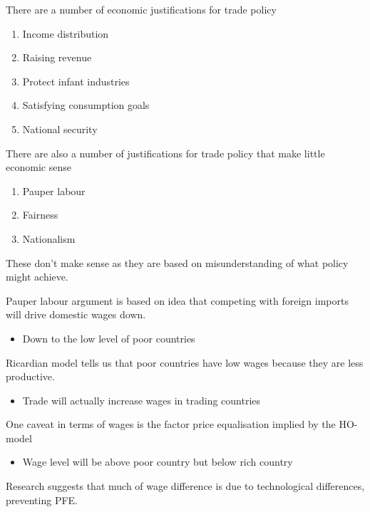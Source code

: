 \documentclass{beamer}
\begin{document}
\begin{frame}
 There are a number of economic justifications for trade policy
 \begin{enumerate}
   \item Income distribution
   \item Raising revenue
   \item Protect infant industries
   \item Satisfying consumption goals
   \item National security
 \end{enumerate}
\end{frame}

\begin{frame}
There are also a number of justifications for trade policy that make little economic sense
\begin{enumerate}
  \item Pauper labour
  \item Fairness
  \item Nationalism
\end{enumerate}
\medskip
These don't make sense as they are based on misunderstanding of what policy might achieve. 
 \end{frame}

\begin{frame}
Pauper labour argument is based on idea that competing with foreign imports will drive domestic wages down.
\begin{itemize}
  \item Down to the low level of poor countries
\end{itemize}
\medskip
Ricardian model tells us that poor countries have low wages because they are less productive.
\begin{itemize}
  \item Trade will actually increase wages in trading countries
\end{itemize}
\medskip
One caveat in terms of wages is the factor price equalisation implied by the HO-model
\begin{itemize}
  \item Wage level will be above poor country but below rich country
\end{itemize}
\medskip
Research suggests that much of wage difference is due to technological differences, preventing PFE.
\end{frame}
\end{document}
